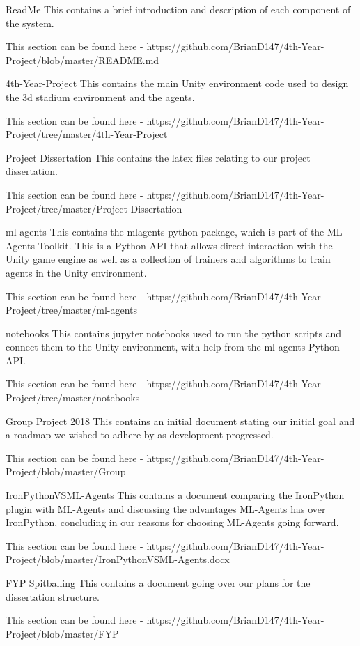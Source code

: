 ReadMe
This contains a brief introduction and description of each component of the system.

This section can be found here - https://github.com/BrianD147/4th-Year-Project/blob/master/README.md


4th-Year-Project
This contains the main Unity environment code used to design the 3d stadium environment and the agents. 

This section can be found here - https://github.com/BrianD147/4th-Year-Project/tree/master/4th-Year-Project


Project Dissertation
This contains the latex files relating to our project dissertation.

This section can be found here - https://github.com/BrianD147/4th-Year-Project/tree/master/Project-Dissertation


ml-agents
This contains the mlagents python package, which is part of the ML-Agents Toolkit. This is a Python API that allows direct interaction with the Unity game engine as well as a collection of trainers and algorithms to train agents in the Unity environment.

This section can be found here - https://github.com/BrianD147/4th-Year-Project/tree/master/ml-agents


notebooks
This contains jupyter notebooks used to run the python scripts and connect them to the Unity environment, with help from the ml-agents Python API.

This section can be found here - https://github.com/BrianD147/4th-Year-Project/tree/master/notebooks


Group Project 2018
This contains an initial document stating our initial goal and a roadmap we wished to adhere by as development progressed.

This section can be found here - https://github.com/BrianD147/4th-Year-Project/blob/master/Group%


IronPythonVSML-Agents
This contains a document comparing the IronPython plugin with ML-Agents and discussing the advantages ML-Agents has over IronPython, concluding in our reasons for choosing ML-Agents going forward.

This section can be found here - https://github.com/BrianD147/4th-Year-Project/blob/master/IronPythonVSML-Agents.docx


FYP Spitballing
This contains a document going over our plans for the dissertation structure.

This section can be found here - https://github.com/BrianD147/4th-Year-Project/blob/master/FYP%


